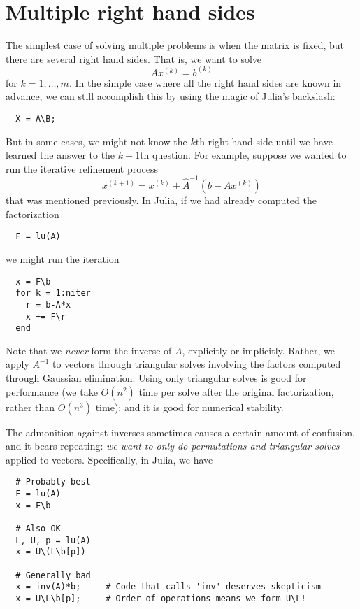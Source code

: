 \documentclass[12pt, leqno]{article}
\begin{document}
\section{Multiple right hand sides}

The simplest case of solving multiple problems is when the matrix
is fixed, but there are several right hand sides.  That is,
we want to solve
\[
  A x^{(k)} = b^{(k)}
\]
for $k = 1, \ldots, m$.  In the simple case where all the right hand
sides are known in advance, we can still accomplish this by using
the magic of Julia's backslash:
\begin{lstlisting}
  X = A\B;
\end{lstlisting}
But in some cases, we might not know the $k$th right hand side until
we have learned the answer to the $k-1$th question.  For example,
suppose we wanted to run the iterative refinement process
\[
  x^{(k+1)} = x^{(k)} + \hat{A}^{-1} (b-Ax^{(k)})
\]
that was mentioned previously.  In Julia, if we had
already computed the factorization
\begin{lstlisting}
  F = lu(A)
\end{lstlisting}
we might run the iteration
\begin{lstlisting}
  x = F\b
  for k = 1:niter
    r = b-A*x
    x += F\r
  end
\end{lstlisting}
Note that we {\em never} form the inverse of $A$, explicitly or implicitly.
Rather, we apply $A^{-1}$ to vectors through triangular solves involving
the factors computed through Gaussian elimination.  Using only
triangular solves is good for performance (we take $O(n^2)$ time per
solve after the original factorization, rather than $O(n^3)$ time);
and it is good for numerical stability.

The admonition against inverses sometimes causes a certain amount of
confusion, and it bears repeating: {\em we want to only do
  permutations and triangular solves} applied to vectors.
Specifically, in Julia, we have
\begin{lstlisting}
  # Probably best
  F = lu(A)
  x = F\b

  # Also OK
  L, U, p = lu(A)
  x = U\(L\b[p])

  # Generally bad
  x = inv(A)*b;     # Code that calls 'inv' deserves skepticism
  x = U\L\b[p];     # Order of operations means we form U\L!
\end{lstlisting}
\end{document}
